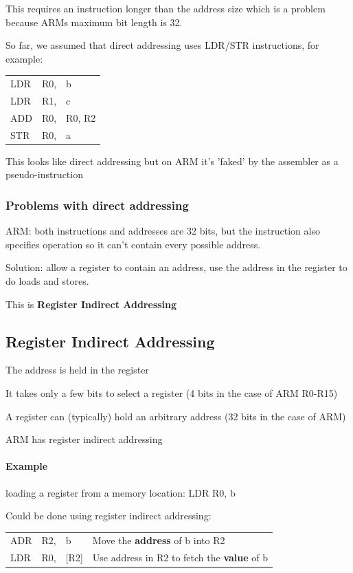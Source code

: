 This requires an instruction longer than the address size which is a problem because ARMs maximum bit length is 32.

So far, we assumed that direct addressing uses LDR/STR instructions, for example:

\begin{center}
    \begin{tabular}{l l l}
        LDR & R0, & b\\
        LDR & R1, & c\\
        ADD & R0, & R0, R2\\
        STR & R0, & a \\
    \end{tabular}
\end{center}

This looks like direct addressing but on ARM it's 'faked' by the assembler as a pseudo-instruction

\subsubsection{Problems with direct addressing}
ARM: both instructions and addresses are 32 bits, but the instruction also specifies operation so it can't contain every possible address.

Solution: allow a register to contain an address, use the address in the register to do loads and stores.

This is {\bf Register Indirect Addressing}

\subsection{Register Indirect Addressing}
The address is held in the register

It takes only a few bits to select a register (4 bits in the case of ARM R0-R15)

A register can (typically) hold an arbitrary address (32 bits in the case of ARM)

ARM has register indirect addressing

\paragraph{Example}
loading a register from a memory location: LDR R0, b

Could be done using register indirect addressing:

\begin{center}
    \begin{tabularx}{0.8\textwidth}{l l l X}
        ADR & R2, & b & Move the {\bf address} of b into R2\\
        LDR & R0, & [R2] & Use address in R2 to fetch the {\bf value} of b\\
    \end{tabularx}
\end{center}

